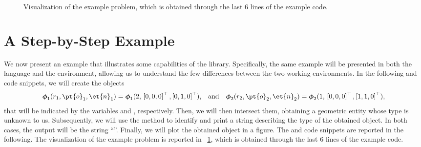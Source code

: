 


\begin{figure}[htb]
  \centering
  \caption{Visualization of the example problem, which is obtained through the last 6 lines of the \Matlab{} example code.}
  \label{app1:fig:acme_example}
\end{figure}

\section{A Step-by-Step Example}
We now present an example that illustrates some capabilities of the \Acme{} library. Specifically, the same example will be presented in both the \cpp{} language and the \Matlab{} environment, allowing us to understand the few differences between the two working environments. In the following \cpp{} and \Matlab{} code snippets, we will create the \Disk{} objects
%
\begin{equation*}
  \boldsymbol{\phi}_1(r_1, \pt{o}_1, \et{n}_1) = \boldsymbol{\phi}_1(2, \, \left[0, 0, 0\right]^{\top}, \left[0, 1, 0\right]^{\top}) \text{,} \quad \text{and} \quad
  \boldsymbol{\phi}_2(r_2, \pt{o}_2, \et{n}_2) = \boldsymbol{\phi}_2(1, \, \left[0, 0, 0\right]^{\top}, \left[1, 1, 0\right]^{\top}) \text{,}
\end{equation*}
%
that will be indicated by the variables  and , respectively. Then, we will then intersect them, obtaining a geometric entity whose type is unknown to us. Subsequently, we will use the  method to identify and print a string describing the type of the obtained \Entity{} object. In both cases, the output will be the string ``''. Finally, we will plot the obtained \Entity{} object in a \Matlab{} figure. The \cpp{} and \Matlab{} code snippets are reported in the following. The visualization of the example problem is reported in \figurename{}~\ref{app1:fig:acme_example}, which is obtained through the last 6 lines of the \Matlab{} example code. \\[1.0em]

